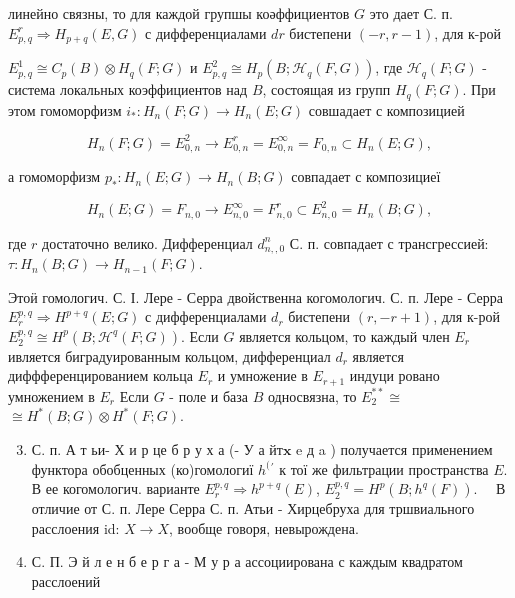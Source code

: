 \documentclass[10pt]{article}
\begin{document}
линейно связны, то для каждой групшы коәффициентов $G$ это дает С. п. $E_{p, q}^{r} \Rightarrow H_{p+q}(E, G)$ с дифференциалами $d r$ бистепени $(-r, r-1)$, для к-рой



$E_{p, q}^{1} \cong C_{p}(B) \otimes H_{q}(F ; G)$ и $E_{p, q}^{2} \cong H_{p}\left(B ; \mathscr{H}_{q}(F, G)\right)$, где $\mathscr{H}_{q}(F ; G)$ - система локальных коэффициентов над $B$, состоящая из групп $H_{q}(F ; G)$. При этом гомоморфизм $i_{*}: H_{n}(F ; G) \rightarrow H_{n}(E ; G)$ совшадает с композицией



\[

H_{n}(F ; G)=E_{0, n}^{2} \longrightarrow E_{0, n}^{r}=E_{0, n}^{\infty}=F_{0, n} \subset H_{n}(E ; G),

\]



а гомоморфизм $p_{*}: H_{n}(E ; G) \rightarrow H_{n}(B ; G)$ совпадает с композициеї



\[

H_{n}(E ; G)=F_{n, 0} \longrightarrow E_{n, 0}^{\infty}=F_{n, 0}^{r} \subset E_{n, 0}^{2}=H_{n}(B ; G),

\]



где $r$ достаточно велико. Дифференциал $d_{n,, 0}^{n}$ С. п. совпадает с трансгрессией: $\tau: H_{n}(B ; G) \rightarrow H_{n-1}(F ; G)$.



Этоӥ гомологич. С. І. Лере - Серра двойственна когомологич. С. п. Лере - Серра $E_{r}^{p, q} \Rightarrow H^{p+q}(E ; G)$ с дифференциалами $d_{r}$ бистепени $(r,-r+1)$, для к-рой $E_{2}^{p, q} \cong H^{p}\left(B ; \mathscr{H}^{q}(F ; G)\right)$. Если $G$ является кольцом, то каждый член $E_{r}$ ивляется биградуированным кольцом, дифференциал $d_{r}$ является диффференцированием кольца $E_{r}$ и умножение в $E_{r+1}$ индуци ровано умножением в $E_{r}$ Если $G$ - поле и база $B$ односвязна, то $E_{2}^{* *} \cong$ $\cong H^{*}(B ; G) \otimes H^{*}(F ; G)$.



\begin{enumerate}

  \setcounter{enumi}{2}

  \item С. п. А т ьи- Х и р це б р у х а (- У а йт$\mathbf{x}$ e д a ) получается применением функтора обобценных (ко)гомологиї $h^{(}{ }^{\prime}$ к тої же фильтрации пространства $E$. В ее когомологич. варианте $E_{r}^{p, q} \Rightarrow h^{p+q}(E)$, $E_{2}^{p, q}=H^{p}\left(B ; h^{q}(F)\right) . \quad$ В отличие от С. п. Лере Серра С. п. Атьи - Хирцебруха для тршвиального расслоения id: $X \rightarrow X$, вообще говоря, невырождена.



  \item С. П. Э й л е н б е р г а - М у р а ассоциирована с каждым квадратом расслоений



\end{enumerate}
\end{document}
